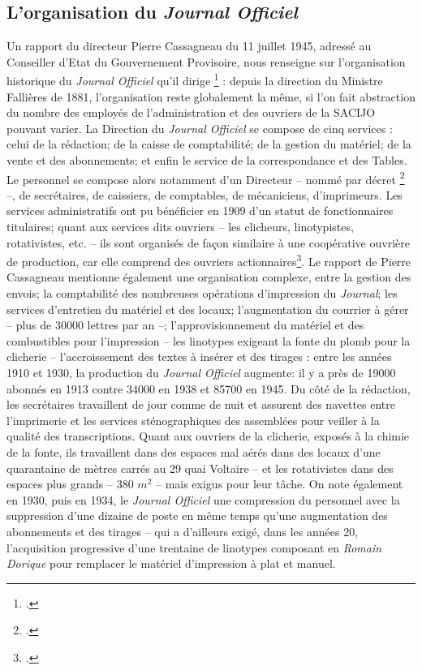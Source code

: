\subsection{L'organisation du \emph{Journal Officiel}}

Un rapport du directeur Pierre Cassagneau du 11 juillet 1945, adressé au Conseiller d'Etat du Gouvernement Provisoire, nous renseigne sur l'organisation historique du \emph{Journal Officiel} qu'il dirige \footcite[][]{cote6} : depuis la direction du Ministre Fallières de 1881, l'organisation reste globalement la même, si l'on fait abstraction du nombre des employés de l'administration et des ouvriers de la SACIJO pouvant varier. La Direction du \emph{Journal Officiel} se compose de cinq services : celui de la rédaction; de la caisse de comptabilité; de la gestion du matériel; de la vente et des abonnements; et enfin le service de la correspondance et des Tables. Le personnel se compose alors notamment d'un Directeur -- nommé par décret \footcite[][]{cote1} --, de secrétaires, de caissiers, de comptables, de mécaniciens, d'imprimeurs. Les services administratifs ont pu bénéficier en 1909 d'un statut de fonctionnaires titulaires; quant aux services dits ouvriers -- les clicheurs, linotypistes, rotativistes, etc. -- ils sont organisés de façon similaire à une coopérative ouvrière de production, car elle comprend des ouvriers actionnaires\footcite[][]{cote6}. Le rapport de Pierre Cassagneau mentionne également une organisation complexe, entre la gestion des envois; la comptabilité des nombreuses opérations d'impression du \emph{Journal}; les services d'entretien du matériel et des locaux; l'augmentation du courrier à gérer --  plus de 30000 lettres par an --; l'approvisionnement du matériel et des combustibles pour l'impression -- les linotypes exigeant la fonte du plomb pour la clicherie -- l'accroissement des textes à insérer et des tirages : entre les années 1910 et 1930, la production du \emph{Journal Officiel} augmente: il y a près de 19000 abonnés en 1913 contre 34000 en 1938 et 85700 en 1945. Du côté de la rédaction, les secrétaires travaillent de jour comme de nuit et assurent des navettes entre l'imprimerie et les services sténographiques des assemblées pour veiller à la qualité des transcriptions. Quant aux ouvriers de la clicherie, exposés à la chimie de la fonte, ils travaillent dans des espaces mal aérés dans des locaux d'une quarantaine de mètres carrés au 29 quai Voltaire -- et les rotativistes dans des espaces plus grands -- 380 $m^2$ -- mais exigus pour leur tâche. On note également en 1930, puis en 1934, le \emph{Journal Officiel} une compression du personnel avec la suppression d'une dizaine de poste en même temps qu'une augmentation des abonnements et des tirages -- qui a d'ailleurs exigé, dans les années 20, l'acquisition progressive d'une trentaine de linotypes composant en \emph{Romain Dorique} pour remplacer le matériel d'impression à plat et manuel.


